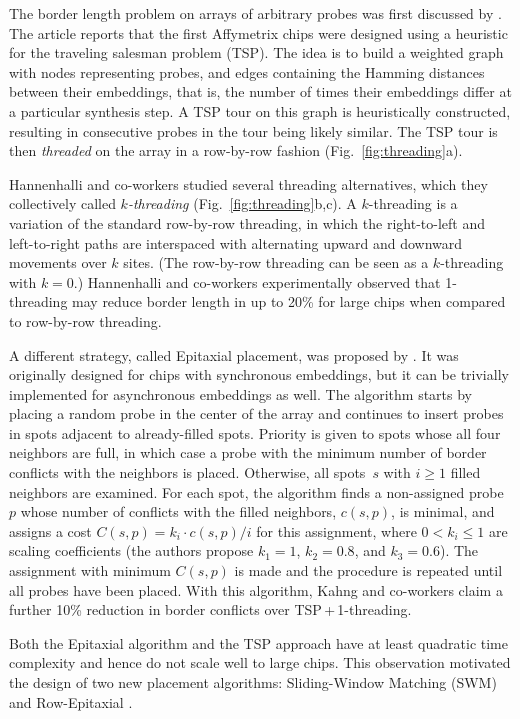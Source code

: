 The border length problem on arrays of arbitrary probes was first
discussed by \citet{Hannenhalli2002}. The article reports that the
first Affymetrix chips were designed using a heuristic for the
traveling salesman problem (TSP). The idea is to build a weighted
graph with nodes representing probes, and edges containing the Hamming
distances between their embeddings, that is, the number of times their
embeddings differ at a particular synthesis step. A TSP tour on this
graph is heuristically constructed, resulting in consecutive probes in
the tour being likely similar. The TSP tour is then \emph{threaded} on
the array in a row-by-row fashion (Fig.~\ref{fig:threading}a).

Hannenhalli and co-workers studied several threading alternatives,
which they collectively called \emph{$k$-threading}
(Fig.~\ref{fig:threading}b,c). A $k$-threading is a variation of the
standard row-by-row threading, in which the right-to-left and
left-to-right paths are interspaced with alternating upward and
downward movements over $k$ sites. (The row-by-row threading can be
seen as a $k$-threading with $k=0$.) Hannenhalli and co-workers
experimentally observed that 1-threading may reduce border length in up to
20\% for large chips when compared to row-by-row threading.

A different strategy, called Epitaxial placement, was proposed by
\citet{Kahng2002}. It was originally designed for chips with synchronous
embeddings, but it can be trivially implemented for asynchronous embeddings as
well. The algorithm starts by placing a random probe in the center of the array
and continues to insert probes in spots adjacent to already-filled spots.
Priority is given to spots whose all four neighbors are full, in which case a
probe with the minimum number of border conflicts with the neighbors is placed.
Otherwise, all spots~$s$ with $i \geq 1$ filled neighbors are examined. For each
spot, the algorithm finds a non-assigned probe~$p$ whose number of conflicts
with the filled neighbors, $c(s,p)$, is minimal, and assigns a cost
$C(s,p) = k_i \cdot c(s,p) / i$ for this assignment, where $0 < k_i \leq 1$ are
scaling coefficients (the authors propose $k_1 = 1$, $k_2 = 0.8$, and
$k_3 = 0.6$). The assignment with minimum $C(s,p)$ is made and the procedure is
repeated until all probes have been placed. With this algorithm, Kahng and
co-workers claim a further 10\% reduction in border conflicts over
TSP\,+\,1-threading.

Both the Epitaxial algorithm and the TSP approach have at least quadratic time
complexity and hence do not scale well to large chips. This observation
motivated the design of two new placement algorithms: Sliding-Window Matching
(SWM) and Row-Epitaxial \citep{Kahng2003}.



